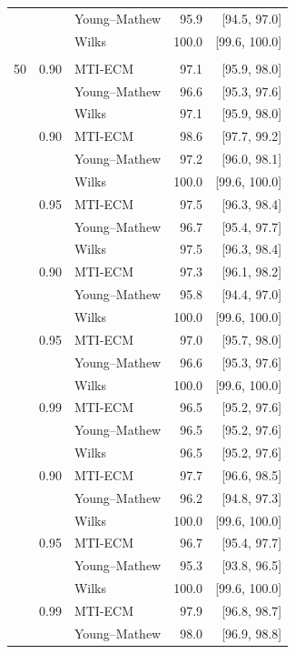\begin{longtable}{@{}rrlrr@{}}
 &  & Young--Mathew & 95.9 & [94.5, 97.0] \\
 &  & Wilks & 100.0 & [99.6, 100.0] \\
\addlinespace[0.2em]
\multicolumn{5}{@{}l}{\textit{Gaussian}}\\
50 & 0.90 & MTI-ECM & 97.1 & [95.9, 98.0] \\
 &  & Young--Mathew & 96.6 & [95.3, 97.6] \\
 &  & Wilks & 97.1 & [95.9, 98.0] \\
\addlinespace[0.2em]
100 & 0.90 & MTI-ECM & 98.6 & [97.7, 99.2] \\
 &  & Young--Mathew & 97.2 & [96.0, 98.1] \\
 &  & Wilks & 100.0 & [99.6, 100.0] \\
\addlinespace[0.2em]
100 & 0.95 & MTI-ECM & 97.5 & [96.3, 98.4] \\
 &  & Young--Mathew & 96.7 & [95.4, 97.7] \\
 &  & Wilks & 97.5 & [96.3, 98.4] \\
\addlinespace[0.2em]
500 & 0.90 & MTI-ECM & 97.3 & [96.1, 98.2] \\
 &  & Young--Mathew & 95.8 & [94.4, 97.0] \\
 &  & Wilks & 100.0 & [99.6, 100.0] \\
\addlinespace[0.2em]
500 & 0.95 & MTI-ECM & 97.0 & [95.7, 98.0] \\
 &  & Young--Mathew & 96.6 & [95.3, 97.6] \\
 &  & Wilks & 100.0 & [99.6, 100.0] \\
\addlinespace[0.2em]
500 & 0.99 & MTI-ECM & 96.5 & [95.2, 97.6] \\
 &  & Young--Mathew & 96.5 & [95.2, 97.6] \\
 &  & Wilks & 96.5 & [95.2, 97.6] \\
\addlinespace[0.2em]
1000 & 0.90 & MTI-ECM & 97.7 & [96.6, 98.5] \\
 &  & Young--Mathew & 96.2 & [94.8, 97.3] \\
 &  & Wilks & 100.0 & [99.6, 100.0] \\
\addlinespace[0.2em]
1000 & 0.95 & MTI-ECM & 96.7 & [95.4, 97.7] \\
 &  & Young--Mathew & 95.3 & [93.8, 96.5] \\
 &  & Wilks & 100.0 & [99.6, 100.0] \\
\addlinespace[0.2em]
1000 & 0.99 & MTI-ECM & 97.9 & [96.8, 98.7] \\
 &  & Young--Mathew & 98.0 & [96.9, 98.8] \\

\end{longtable}
